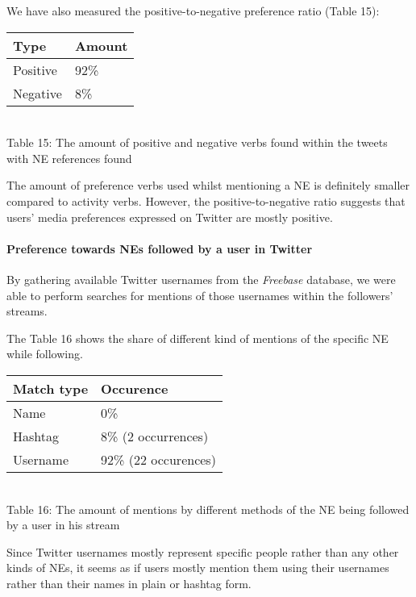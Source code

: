 We have also measured the positive-to-negative preference ratio (Table 15):

\begin{center}
  \begin{tabular}{ | p{3cm}| p{2cm} | } \hline
    Type & Amount \\ \hline
    Positive & 92\% \\ \hline
    Negative & 8\% \\ \hline
  \end{tabular} \\
  Table 15: The amount of positive and negative verbs found within the tweets with NE references found \\
\end{center}

The amount of preference verbs used whilst mentioning a NE is definitely
smaller compared to activity verbs. However, the positive-to-negative ratio suggests that users'
media preferences expressed on Twitter are mostly positive.

\paragraph{Preference towards NEs followed by a user in Twitter}
By gathering available Twitter usernames from the \textit{Freebase} database,
we were able to perform searches for mentions of those usernames within the followers' streams.

The Table 16 shows the share of different kind of mentions of the specific NE while following.

\begin{center}
  \begin{tabular}{ | p{3cm}| p{3.5cm} | } \hline
    Match type & Occurence \\ \hline
    Name & 0\% \\ \hline
    Hashtag & 8\% (2 occurrences) \\ \hline
    Username & 92\% (22 occurences) \\ \hline
  \end{tabular} \\
  Table 16: The amount of mentions by different methods of the NE being followed by a user in his stream \\
\end{center}

Since Twitter usernames mostly represent specific people rather than any other kinds of NEs, it seems as if users mostly
mention them using their usernames rather than their names in plain or hashtag form.

